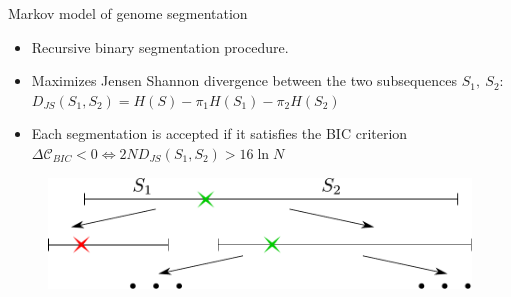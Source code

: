 \documentclass{beamer}
\begin{document}
\begin{frame}{Markov model of genome segmentation \citep{thakur2007markov}}


\begin{itemize}

\item Recursive binary segmentation procedure. 

\item Maximizes Jensen Shannon divergence between the two subsequences $ S_1,\ S_2 $: $D_{JS}(S_1, S_2) = H(S) - \pi_1 H(S_1) - \pi_2 H(S_2) $

\item Each segmentation is accepted if it satisfies the BIC criterion $ \Delta \mathcal{C}_{BIC}<0 \iff 2ND_{JS}(S_1, S_2) > 16 \ln N $

\end{itemize}

\begin{figure}[h]
	\centering
	\includegraphics[width=1\linewidth]{binary_segmentation_alg.pdf}
\end{figure}

\end{frame}
\end{document}
